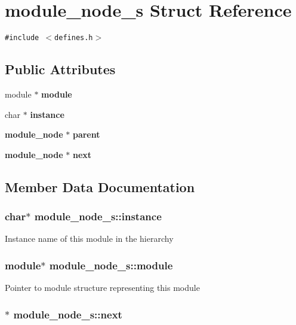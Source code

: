 \section{module\_\-node\_\-s  Struct Reference}
\label{structmodule__node__s}
{\tt \#include $<$defines.h$>$}

\subsection*{Public Attributes}
\begin{CompactItemize}
\item 
module $\ast$ {\bf module}
\item 
char $\ast$ {\bf instance}
\item 
{\bf module\_\-node} $\ast$ {\bf parent}
\item 
{\bf module\_\-node} $\ast$ {\bf next}
\end{CompactItemize}


\subsection{Member Data Documentation}
\subsubsection{\setlength{\rightskip}{0pt plus 5cm}char$\ast$ module\_\-node\_\-s::instance}\label{structmodule__node__s_m1}


Instance name of this module in the hierarchy 
\subsubsection{\setlength{\rightskip}{0pt plus 5cm}module$\ast$ module\_\-node\_\-s::module}\label{structmodule__node__s_m0}


Pointer to module structure representing this module 
\subsubsection{$\ast$ module\_\-node\_\-s::next}\label{structmodule__node__s_m3}


